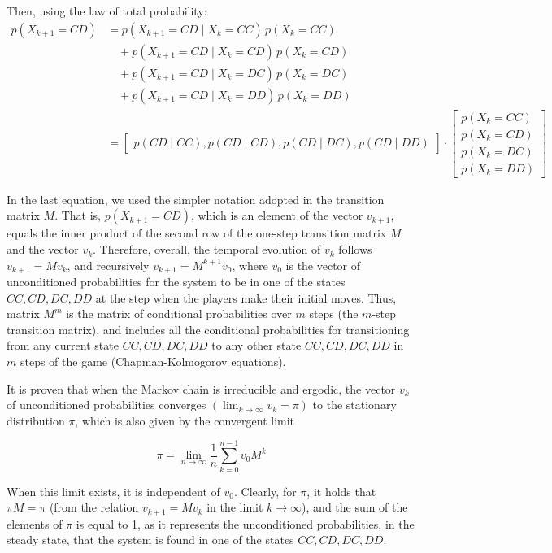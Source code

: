 \documentclass[12pt]{article}
\begin{document}
Then, using the law of total probability: \[
\begin{aligned}
p(X_{k+1} = CD) &= p(X_{k+1} = CD \mid X_k = CC) \, p(X_k = CC) \\
&\quad + p(X_{k+1} = CD \mid X_k = CD) \, p(X_k = CD) \\
&\quad + p(X_{k+1} = CD \mid X_k = DC) \, p(X_k = DC) \\
&\quad + p(X_{k+1} = CD \mid X_k = DD) \, p(X_k = DD) \\
&= 
\begin{bmatrix}
p(CD \mid CC) , p(CD \mid CD) , p(CD \mid DC) , p(CD \mid DD)
\end{bmatrix}
\cdot
\begin{bmatrix}
p(X_k = CC) \\
p(X_k = CD) \\
p(X_k = DC) \\
p(X_k = DD)
\end{bmatrix}
\end{aligned}
\]

In the last equation, we used the simpler notation adopted in the transition matrix \( M \). That is, \( p(X_{k+1} = CD) \), which is an element of the vector \( v_{k+1} \), equals the inner product of the second row of the one-step transition matrix \( M \) and the vector \( v_k \). Therefore, overall, the temporal evolution of \( v_k \) follows \( v_{k+1} = M v_k \), and recursively \( v_{k+1} = M^{k+1} v_0 \), where \( v_0 \) is the vector of unconditioned probabilities for the system to be in one of the states \( CC, CD, DC, DD \) at the step when the players make their initial moves.  Thus, matrix \( M^m \) is the matrix of conditional probabilities over \( m \) steps (the \( m \)-step transition matrix), and includes all the conditional probabilities for transitioning from any current state \( CC, CD, DC, DD \) to any other state \( CC, CD, DC, DD \) in \( m \) steps of the game (Chapman-Kolmogorov equations).


It is proven that when the Markov chain is irreducible and ergodic, the vector \( v_k \) of unconditioned probabilities converges \( (\lim_{k \to \infty} v_k = \pi) \) to the stationary distribution \( \pi \), which is also given by the convergent limit 

\[
\pi = \lim_{n \to \infty} \frac{1}{n} \sum_{k=0}^{n-1} v_0 M^k
\]

When this limit exists, it is independent of \( v_0 \). Clearly, for \( \pi \), it holds that \( \pi M = \pi \) (from the relation \( v_{k+1} = M v_k \) in the limit \( k \to \infty \)), and the sum of the elements of \( \pi \) is equal to 1, as it represents the unconditioned probabilities, in the steady state, that the system is found in one of the states \( CC, CD, DC, DD \). 
\end{document}
